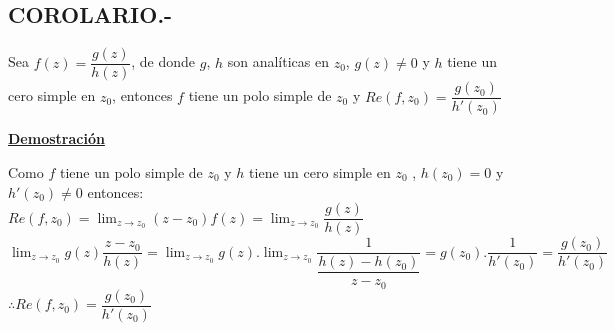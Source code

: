 \documentclass[10pt,a4paper]{article}
\begin{document}
\subsection{COROLARIO.-} 
Sea $f(z) = \dfrac{g(z)}{h(z)}$, de donde $g$, $h$ son analíticas en $z_0$, $g(z) \neq 0$ y $h$ tiene un cero simple en $z_0$, entonces $f$ tiene un polo simple de $z_0$ y $Re(f,z_0) = \dfrac{g(z_0)}{h'(z_0)}$
\begin{center}
\textbf{\underline{Demostración}}
\end{center}
Como $f$ tiene un polo simple de $z_0$ y $h$ tiene un cero simple en $z_0$ , $h(z_0) = 0$ y $h'(z_0) \neq 0$ entonces: \\
$\displaystyle{Re(f,z_0) = \lim_{z \to z_0} (z-z_0) f(z) = \lim_{z \to z_0} \dfrac{g(z)}{h(z)}}$ \\
$\displaystyle{\lim_{z \to z_0} g(z) \dfrac{z-z_0}{h(z)} = \lim_{z \to z_0} g(z). \lim_{z \to z_0} \dfrac{1}{\dfrac{h(z) - h(z_0)}{z-z_0}} = g(z_0) . \dfrac{1}{h'(z_0)} = \dfrac{g(z_0)}{h'(z_0)}}$ \\
$\therefore Re(f,z_0) = \dfrac{g(z_0)}{h'(z_0)}$
\end{document}
